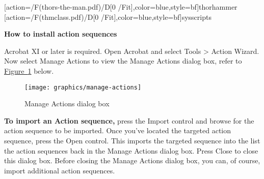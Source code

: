 \documentclass{article}
\title{\acInstr}
\author{D. P. Story}
\def\app#1{\textsf{#1}}
\let\uif\textsf
\begin{document}
\maketitle

[action={\GoToR/F(thors-the-man.pdf)/D[0 /Fit]},color=blue,style={bf}]{thorhammer}
[action={\GoToR/F(thmclass.pdf)/D[0 /Fit]},color=blue,style={bf}]{sysscripts}

\thispagestyle{empty}

\begin{center}\large\bfseries
  How to install action sequences
\end{center}

\noindent \app{Acrobat XI} or later is required. Open \app{Acrobat} and
select \uif{Tools > Action Wizard}. Now select \uif{Manage Actions} to view
the \uif{Manage Actions} dialog box, refer to
\hyperref[fig:MA]{Figure~\ref*{fig:MA}} below.

\begin{figure}[htb]\centering
\texttt{[image: graphics/manage-actions]}
\caption{Manage Actions dialog box}\label{fig:MA}
\end{figure}

\noindent \textbf{To import an Action sequence,} press the \uif{Import}
control and browse for the action sequence to be imported. Once you've
located the targeted action sequence, press the \uif{Open} control. This
imports the targeted sequence into the list the action sequences back in the
\uif{Manage Actions} dialog box. Press \uif{Close} to close this dialog box.
Before closing the \uif{Manage Actions} dialog box, you can, of course,
import additional action sequences.
\end{document}
